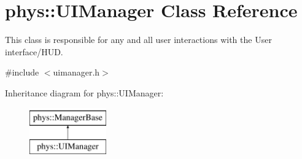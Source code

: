 \hypertarget{classphys_1_1UIManager}{
\section{phys::UIManager Class Reference}
\label{d5/dc5/classphys_1_1UIManager}
}


This class is responsible for any and all user interactions with the User interface/HUD.  




{\ttfamily \#include $<$uimanager.h$>$}

Inheritance diagram for phys::UIManager:\begin{figure}[H]
\begin{center}
\leavevmode
\includegraphics[height=2.000000cm]{d5/dc5/classphys_1_1UIManager}
\end{center}
\end{figure}
